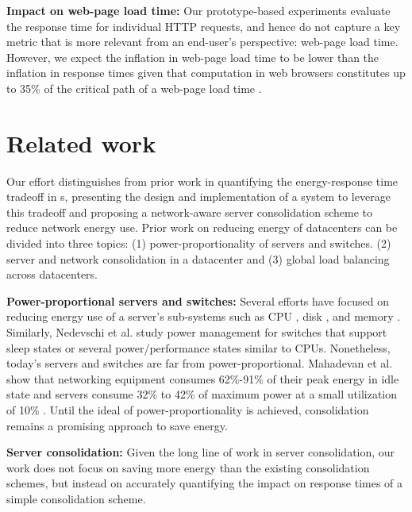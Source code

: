 \textbf{Impact on web-page load time:} Our prototype-based experiments evaluate the response time for individual HTTP requests, and hence do not capture a key metric that is more relevant from an end-user's perspective: web-page load time. However, we expect the inflation in web-page load time to be lower than the inflation in response times given that computation in web browsers constitutes up to 35\% of the critical path of a web-page load time \cite{wprof}.



\section{Related work}

Our effort distinguishes from prior work in quantifying the energy-response time tradeoff  in \cdc s, presenting the design and implementation of a system to leverage this tradeoff and proposing a network-aware server consolidation scheme to reduce network energy use.  Prior work on reducing energy of datacenters can be divided into three topics: (1) power-proportionality of servers and switches.  (2) server and network consolidation in a datacenter and (3) global load balancing across datacenters.

\textbf{Power-proportional servers and switches:}  Several efforts have focused on reducing energy use of a server's sub-systems such as CPU \cite{dvfs}, disk \cite{lu1999adaptive}, and memory \cite{fan2001memory}. Similarly, Nedevschi et al. \cite{Nedevschi08} study power management for switches that support sleep states or several power/performance states similar to CPUs. Nonetheless, today's servers and switches are far from power-proportional. Mahadevan et al. show that networking equipment consumes 62\%-91\% of their peak energy in idle state \cite{mahadevan2009power} and servers consume 32\% to 42\% of maximum power at a small utilization of 10\% \cite{spec}. Until the ideal of power-proportionality is achieved, consolidation remains a promising approach to save energy.

\textbf{Server consolidation:} Given the long line of work in server consolidation, our work does not focus on saving more energy than the existing consolidation schemes, but instead on accurately quantifying the impact on response times of a simple consolidation scheme.


